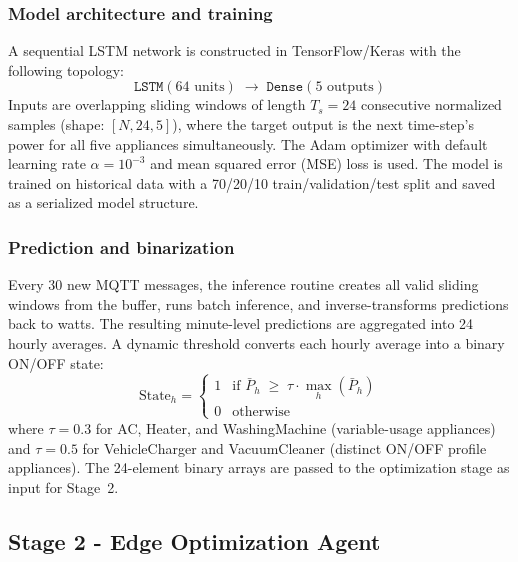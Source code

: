 \documentclass[conference]{IEEEtran}
\begin{document}
\subsubsection{Model architecture and training}
A sequential LSTM network is constructed in TensorFlow/Keras
with the following topology:
\[
  \texttt{LSTM}(64\text{ units}) \;\rightarrow\;
  \texttt{Dense}(5\text{ outputs})
\]
Inputs are overlapping sliding windows of length
$T_s = 24$ consecutive normalized samples
(shape: $[N, 24, 5]$), where the target output is the
next time-step's power for all five appliances simultaneously.
The Adam optimizer with default
learning rate $\alpha = 10^{-3}$ and mean squared error (MSE)
loss is used.
The model is trained on historical data with a 70/20/10
train/validation/test split and saved as a serialized model structure.

\subsubsection{Prediction and binarization}
Every 30 new MQTT messages, the inference routine creates
all valid sliding windows from the buffer, runs batch inference,
and inverse-transforms predictions back to watts.
The resulting minute-level predictions are aggregated into
24 hourly averages.
A dynamic threshold converts each hourly average into a binary
ON/OFF state:
\[
  \text{State}_h =
  \begin{cases}
    1 & \text{if } \bar{P}_h \;\geq\; \tau \cdot \max_h(\bar{P}_h) \\
    0 & \text{otherwise}
  \end{cases}
\]
where $\tau = 0.3$ for AC, Heater, and WashingMachine
(variable-usage appliances) and $\tau = 0.5$ for VehicleCharger
and VacuumCleaner (distinct ON/OFF profile appliances).
The 24-element binary arrays are passed to the optimization stage
as input for Stage~2.

\subsection{Stage 2 - Edge Optimization Agent}
\end{document}
